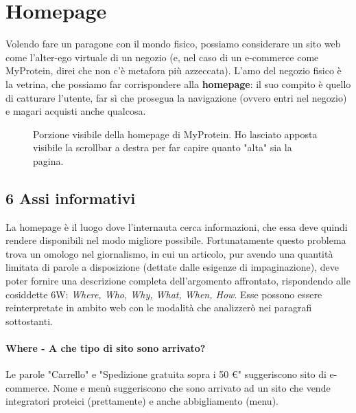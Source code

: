 \section{Homepage}
Volendo fare un paragone con il mondo fisico, possiamo considerare un sito web come l'alter-ego virtuale di un negozio (e, nel caso di un e-commerce come MyProtein, direi che non c'è metafora più azzeccata). L'amo del negozio fisico è la vetrina, che possiamo far corrispondere alla \textbf{homepage}: il suo compito è quello di catturare l'utente, far sì che prosegua la navigazione (ovvero entri nel negozio) e magari acquisti anche qualcosa.
\begin{figure}[!htb]
	\caption{\label{fig:figura1} Porzione visibile della homepage di MyProtein. Ho lasciato apposta visibile la scrollbar a destra per far capire quanto "alta" sia la pagina.}
\end{figure}
\subsection{6 Assi informativi}
La homepage è il luogo dove l'internauta cerca informazioni, che essa deve quindi rendere disponibili nel modo migliore possibile. Fortunatamente questo problema trova un omologo nel giornalismo, in cui un articolo, pur avendo una quantità limitata di parole a disposizione (dettate dalle esigenze di impaginazione), deve poter fornire una descrizione completa dell'argomento affrontato, rispondendo alle cosiddette 6W: \textit{Where, Who, Why, What, When, How}. Esse possono essere reinterpretate in ambito web con le modalità che analizzerò nei paragrafi sottostanti.
\paragraph{Where - A che tipo di sito sono arrivato?}
Le parole "Carrello" e "Spedizione gratuita sopra i 50 \euro" suggeriscono sito di e-commerce. Nome e menù suggeriscono che sono arrivato ad un sito che vende integratori proteici (prettamente) e anche abbigliamento (menu). 

